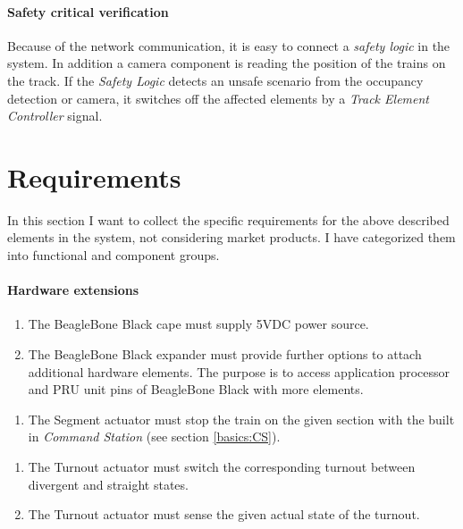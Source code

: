 \paragraph{Safety critical verification}
Because of the network communication, it is easy to connect a \textit{safety logic} in the system. In addition a camera component is reading the position of the trains on the track. If the \textit{Safety Logic} detects an unsafe scenario from the occupancy detection or camera, it switches off the affected elements by a \textit{Track Element Controller} signal.

\section{Requirements}\label{section:REQ}
In this section I want to collect the specific requirements for the above described elements in the system, not considering market products. I have categorized them into functional and component groups.


\paragraph{Hardware extensions}
\begin{enumerate}[label=REQ-BBB-\arabic*, leftmargin=*, format=\small]
	\item The BeagleBone Black cape must supply 5VDC power source.
	\item The BeagleBone Black expander must provide further options to attach additional hardware elements. The purpose is to access application processor and PRU unit pins of BeagleBone Black with more elements.
\end{enumerate}

\begin{enumerate}[label=REQ-SA-\arabic*, leftmargin=*, format=\small]
	\item The Segment actuator must stop the train on the given section with the built in \textit{Command Station} (see section \ref{basics:CS}).
\end{enumerate}

\begin{enumerate}[label=REQ-TA-\arabic*, leftmargin=*, format=\small]
	\item The Turnout actuator must switch the corresponding turnout between divergent and straight states.
	\item The Turnout actuator must sense the given actual state of the turnout.
\end{enumerate}

